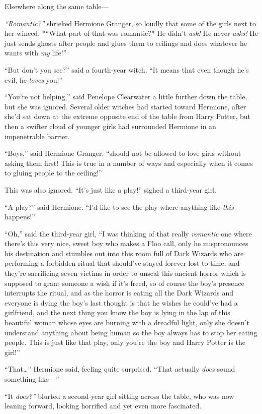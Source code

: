 Elsewhere along the same table---

\emph{``Romantic?''} shrieked Hermione Granger, so loudly that some of
the girls next to her winced. *``What part of that was romantic?* He
didn't \emph{ask!} He never \emph{asks!} He just sends ghosts after
people and glues them to ceilings and does whatever he wants with
\emph{my} life!''

``But don't you see?'' said a fourth-year witch. ``It means that even
though he's evil, he \emph{loves} you!''

``You're not helping,'' said Penelope Clearwater a little further down
the table, but she was ignored. Several older witches had started toward
Hermione, after she'd sat down at the extreme opposite end of the table
from Harry Potter, but then a swifter cloud of younger girls had
surrounded Hermione in an impenetrable barrier.

``Boys,'' said Hermione Granger, ``should not be allowed to love girls
without asking them first! This is true in a number of ways and
especially when it comes to gluing people to the ceiling!''

This was also ignored. ``It's just like a play!'' sighed a third-year
girl.

``A play?'' said Hermione. ``I'd like to see the play where anything
like \emph{this} happens!''

``Oh,'' said the third-year girl, ``I was thinking of that really
\emph{romantic} one where there's this very nice, sweet boy who makes a
Floo call, only he mispronounces his destination and stumbles out into
this room full of Dark Wizards who are performing a forbidden ritual
that should've stayed forever lost to time, and they're sacrificing
seven victims in order to unseal this ancient horror which is supposed
to grant someone a wish if it's freed, so of course the boy's presence
interrupts the ritual, and as the horror is eating all the Dark Wizards
and everyone is dying the boy's last thought is that he wishes he
could've had a girlfriend, and the next thing you know the boy is lying
in the lap of this beautiful woman whose eyes are burning with a
dreadful light, only she doesn't understand anything about being human
so the boy always has to stop her eating people. This is just like that
play, only you're the boy and Harry Potter is the girl!''

``That\ldots{}'' Hermione said, feeling quite surprised. ``That actually
\emph{does} sound something like---''

``It \emph{does?''} blurted a second-year girl sitting across the table,
who was now leaning forward, looking horrified and yet even more
fascinated.

